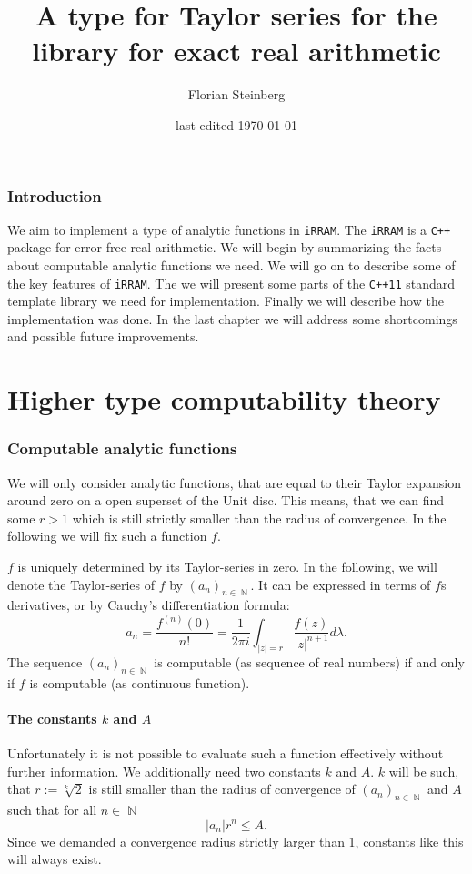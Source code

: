 \documentclass{article}
\title{A type for Taylor series for the \cc library \irram for exact real arithmetic}
\date{last edited \today}
\author{Florian Steinberg}
\DeclareMathOperator{\NN}{\ensuremath{\mathbb{N}}\xspace}
\newcommand{\irram}{\texttt{iRRAM}\xspace}
\newcommand{\cc}{\texttt{C++}\xspace}
\newcommand{\ccOx}{\texttt{C++11}\xspace}
\begin{document}
\maketitle
\newpage
\tableofcontents
\newpage
\section*{Introduction}

We aim to implement a type of analytic functions in \irram. The \irram is a \cc package for error-free real arithmetic. We will begin by summarizing the facts about computable analytic functions we need. We will go on to describe some of the key features of \irram. The we will present some parts of the \ccOx standard template library we need for implementation. Finally we will describe how the implementation was done. In the last chapter we will address some shortcomings and possible future improvements.

\part{Higher type computability theory}

\section{Computable analytic functions}

We will only consider analytic functions, that are equal to their Taylor expansion around zero on a open superset of the Unit disc. This means, that we can find some $r>1$ which is still strictly smaller than the radius of convergence. In the following we will fix such a function $f$.

$f$ is uniquely determined by its Taylor-series in zero. In the following, we will denote the Taylor-series of $f$ by $(a_n)_{n\in \NN}$. It can be expressed in terms of $f$s derivatives, or by Cauchy's differentiation formula:
\[ a_n = \frac{f^{(n)}(0)}{n!} = \frac 1 {2\pi i}\int_{|z| = r} \frac{f(z)}{|z|^{n+1}} d\lambda. \]
The sequence $(a_n)_{n\in \NN}$ is computable (as sequence of real numbers) if and only if $f$ is computable (as continuous function). 

\subsection{The constants $k$ and $A$}

Unfortunately it is not possible to evaluate such a function effectively without further information. We additionally need two constants $k$ and $A$. $k$ will be such, that $r:=\sqrt[k]{2}$ is still smaller than the radius of convergence of $(a_n)_{n\in \NN}$ and $A$ such that for all $n\in \NN$
\[ |a_n|  r^n \leq A. \]
Since we demanded a convergence radius strictly larger than 1, constants like this will always exist.
\end{document}

